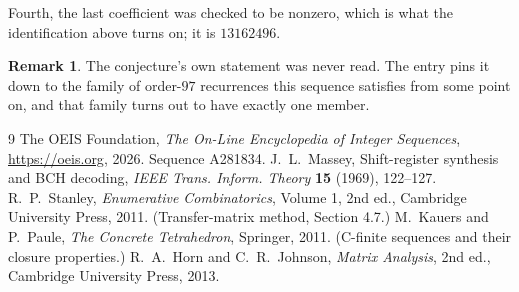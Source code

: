 \documentclass[11pt,a4paper]{article}
\theoremstyle{plain}
\theoremstyle{definition}
\newtheorem{remark}[theorem]{Remark}
\begin{document}
Fourth, the last coefficient was checked to be nonzero, which is what the identification above
turns on; it is $13162496$.

\begin{remark}
The conjecture's own statement was never read. The entry pins it down to the family of
order-$97$ recurrences this sequence satisfies from some point on, and that family turns
out to have exactly one member.
\end{remark}

\begin{thebibliography}{9}
 The OEIS Foundation, \emph{The On-Line Encyclopedia of Integer
Sequences}, \url{https://oeis.org}, 2026. Sequence A281834.
 J.~L.~Massey, Shift-register synthesis and BCH decoding, \emph{IEEE
Trans. Inform. Theory} \textbf{15} (1969), 122--127.
 R.~P.~Stanley, \emph{Enumerative Combinatorics}, Volume 1, 2nd ed.,
Cambridge University Press, 2011. (Transfer-matrix method, Section 4.7.)
 M.~Kauers and P.~Paule, \emph{The Concrete Tetrahedron}, Springer, 2011.
(C-finite sequences and their closure properties.)
 R.~A.~Horn and C.~R.~Johnson, \emph{Matrix Analysis}, 2nd ed., Cambridge
University Press, 2013.
\end{thebibliography}
\end{document}

